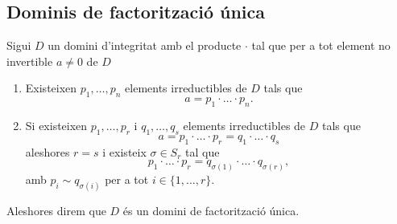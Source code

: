 \documentclass[../../Main.tex]{subfiles}
\begin{document}
	\subsection{Dominis de factorització única}
	\begin{definition}
		\label{def:domini de factorització única}
		\label{def:DFU}
		Sigui \(D\) un domini d'integritat amb el producte \(\cdot\) tal que per a tot element no invertible \(a\neq0\) de \(D\)
		\begin{enumerate}
			\item Existeixen \(p_{1},\dots,p_{n}\) elements irreductibles de \(D\) tals que
			\[a=p_{1}\cdot\ldots\cdot p_{n}.\]
			\item Si existeixen \(p_{1},\dots,p_{r}\) i \(q_{1},\dots,q_{s}\) elements irreductibles de \(D\) tals que
			\[a=p_{1}\cdot\ldots\cdot p_{r}=q_{1}\cdot\ldots\cdot q_{s}\]
			aleshores \(r=s\) i existeix \(\sigma\in S_{r}\) tal que
			\[p_{1}\cdot\ldots\cdot p_{r}=q_{\sigma(1)}\cdot\ldots\cdot q_{\sigma(r)},\]
			amb \(p_{i}\sim q_{\sigma(i)}\) per a tot \(i\in\{1,\dots,r\}\).
		\end{enumerate}
		Aleshores direm que \(D\) és un domini de factorització única.
	\end{definition}
\end{document}
